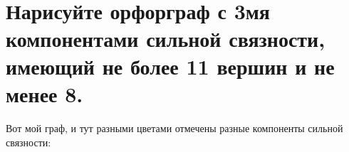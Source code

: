 \documentclass{article}
\begin{document}
            \begin{figure}[h!]
            \end{figure}\\
    \section{Нарисуйте орфорграф с 3мя компонентами сильной связности, имеющий не более 11 вершин и не менее 8.}
        Вот мой граф, и тут разными цветами отмечены разные компоненты сильной связности:
        \begin{figure}[h!]
        \end{figure}
\end{document}
